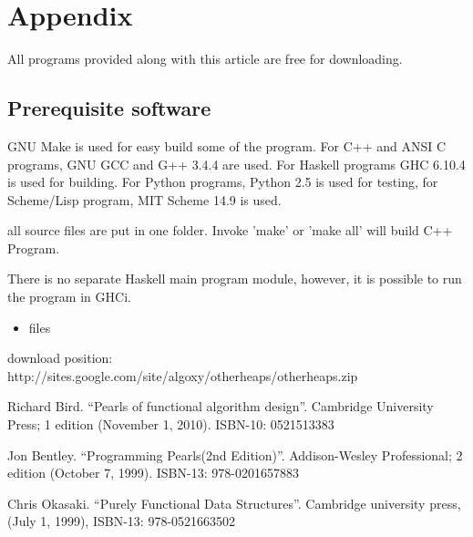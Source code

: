 \documentclass{article}
\begin{document}
\section{Appendix} \label{appendix}
All programs provided along with this article are free for
downloading.

\subsection{Prerequisite software}
GNU Make is used for easy build some of the program. For C++ and ANSI C programs,
GNU GCC and G++ 3.4.4 are used. 
For Haskell programs GHC 6.10.4 is used
for building. For Python programs, Python 2.5 is used for testing, for
Scheme/Lisp program, MIT Scheme 14.9 is used.

all source files are put in one folder. Invoke 'make' or 'make all'
will build C++ Program. 

There is no separate Haskell main program module, however, it is possible to run the program in GHCi.

\begin{itemize}
\item files

\end{itemize}

download position: http://sites.google.com/site/algoxy/otherheaps/otherheaps.zip

\begin{thebibliography}{99}

Richard Bird. ``Pearls of functional algorithm design''. Cambridge University Press; 1 edition (November 1, 2010). ISBN-10: 0521513383

Jon Bentley. ``Programming Pearls(2nd Edition)''. Addison-Wesley Professional; 2 edition (October 7, 1999). ISBN-13: 978-0201657883

Chris Okasaki. ``Purely Functional Data Structures''. Cambridge university press, (July 1, 1999), ISBN-13: 978-0521663502

\end{thebibliography}

\ifx\wholebook\relax \else
\end{document}

